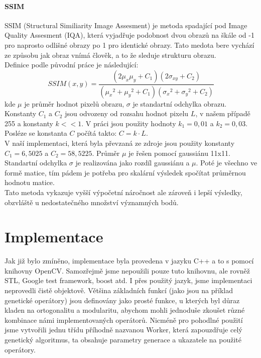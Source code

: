 \documentclass[a4paper,11pt]{scrartcl}
\begin{document}
\paragraph{SSIM}
SSIM (Structural Similiarity Image Assesment) je metoda spadající pod Image Quality Assesment (IQA), která vyjadřuje podobnost dvou obrazů na škále od -1 pro naprosto odlišné obrazy po 1 pro identické obrazy. Tato medota bere vychází ze způsobu jak obraz vnímá člověk, a to že sleduje strukturu obrazu.\\
Definice podle původní práce\cite{ssim} je následující:
\begin{equation}
    SSIM(x,y) = \frac{(2 \mu_x \mu_y + C_1)(2 \sigma_{xy} + C_2)}{({\mu_x}^2 + {\mu_y}^2 + C_1)({\sigma_x}^2 + {\sigma_y}^2 + C_2)}
\end{equation}
kde $\mu$ je průměr hodnot pixelů obrazu, $\sigma$ je standartní odchylka obrazu. Konstanty $C_1$ a $C_2$ jsou odvozeny od rozsahu hodnot pixelu $L$, v našem případě 255 a konstanty $k << 1$. V práci jsou použity hodnoty $k_1 = 0,01$ a $k_2 = 0,03$. Posléze se konstanta $C$ počítá takto: $C = k \cdot L$.\\
V naší implementaci, která byla převzaná ze zdroje \cite{ssim-src} jsou použity konstanty $C_1 = 6,5025$ a $C_2 = 58,5225$. Průměr $\mu$ je řešen pomocí gaussiánu 11x11. Standartní odchylka $\sigma$ je realizována jako rozdíl gaussiánu a $\mu$. Poté je všechno ve formě matice, tím pádem je potřeba pro skalární výsledek spočítat průměrnou hodnotu matice.\\
Tato metoda vykazuje vyšší výpočetní náročnost ale zároveň i lepší výsledky, obzvláště u nedostatečného množství významných bodů.

\section{Implementace}
Jak již bylo zmíněno, implementace byla provedena v jazyku C++ a to s pomocí knihovny OpenCV. Samozřejmě jsme nepoužili pouze tuto knihovnu, ale rovněž STL, Google test framework, boost atd. I přes použitý jazyk, jsme implementaci neprovedli čistě objektově. Většina základních funkcí (jako jsou na příklad genetické operátory) jsou definovány jako prosté funkce, u kterých byl důraz kladen na ortogonalitu a modularitu, abychom mohli jednoduše zkoušet různé kombinace námi implementovaných operátorů. Nicméně pro pohodlné použití jsme vytvořili jednu třídu příhodně nazvanou Worker, která zapouzdřuje celý genetický algoritmus, ta obsahuje parametry generace a ukazatele na použité operátory.
\end{document}
